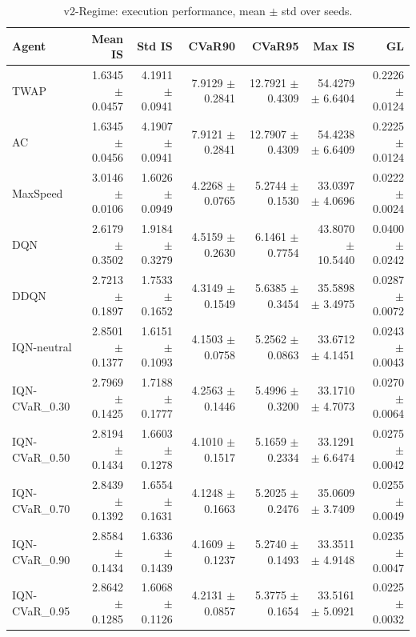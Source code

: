 \begin{table}[H]
    \centering
    \caption{v2-Regime: execution performance, mean $\pm$ std over seeds.}
    \label{tab:v2_regime_aggregate}
    \begin{tabular}{@{}lrrrrrr@{}}
        \toprule
        Agent & Mean IS & Std IS & CVaR90 & CVaR95 & Max IS & GL \\
        \midrule
        TWAP & 1.6345 $\pm$ 0.0457 & 4.1911 $\pm$ 0.0941 & 7.9129 $\pm$ 0.2841 & 12.7921 $\pm$ 0.4309 & 54.4279 $\pm$ 6.6404 & 0.2226 $\pm$ 0.0124 \\
        AC & 1.6345 $\pm$ 0.0456 & 4.1907 $\pm$ 0.0941 & 7.9121 $\pm$ 0.2841 & 12.7907 $\pm$ 0.4309 & 54.4238 $\pm$ 6.6409 & 0.2225 $\pm$ 0.0124 \\
        MaxSpeed & 3.0146 $\pm$ 0.0106 & 1.6026 $\pm$ 0.0949 & 4.2268 $\pm$ 0.0765 & 5.2744 $\pm$ 0.1530 & 33.0397 $\pm$ 4.0696 & 0.0222 $\pm$ 0.0024 \\
        DQN & 2.6179 $\pm$ 0.3502 & 1.9184 $\pm$ 0.3279 & 4.5159 $\pm$ 0.2630 & 6.1461 $\pm$ 0.7754 & 43.8070 $\pm$ 10.5440 & 0.0400 $\pm$ 0.0242 \\
        DDQN & 2.7213 $\pm$ 0.1897 & 1.7533 $\pm$ 0.1652 & 4.3149 $\pm$ 0.1549 & 5.6385 $\pm$ 0.3454 & 35.5898 $\pm$ 3.4975 & 0.0287 $\pm$ 0.0072 \\
        IQN-neutral & 2.8501 $\pm$ 0.1377 & 1.6151 $\pm$ 0.1093 & 4.1503 $\pm$ 0.0758 & 5.2562 $\pm$ 0.0863 & 33.6712 $\pm$ 4.1451 & 0.0243 $\pm$ 0.0043 \\
        IQN-CVaR\_0.30 & 2.7969 $\pm$ 0.1425 & 1.7188 $\pm$ 0.1777 & 4.2563 $\pm$ 0.1446 & 5.4996 $\pm$ 0.3200 & 33.1710 $\pm$ 4.7073 & 0.0270 $\pm$ 0.0064 \\
        IQN-CVaR\_0.50 & 2.8194 $\pm$ 0.1434 & 1.6603 $\pm$ 0.1278 & 4.1010 $\pm$ 0.1517 & 5.1659 $\pm$ 0.2334 & 33.1291 $\pm$ 6.6474 & 0.0275 $\pm$ 0.0042 \\
        IQN-CVaR\_0.70 & 2.8439 $\pm$ 0.1392 & 1.6554 $\pm$ 0.1631 & 4.1248 $\pm$ 0.1663 & 5.2025 $\pm$ 0.2476 & 35.0609 $\pm$ 3.7409 & 0.0255 $\pm$ 0.0049 \\
        IQN-CVaR\_0.90 & 2.8584 $\pm$ 0.1434 & 1.6336 $\pm$ 0.1439 & 4.1609 $\pm$ 0.1237 & 5.2740 $\pm$ 0.1493 & 33.3511 $\pm$ 4.9148 & 0.0235 $\pm$ 0.0047 \\
        IQN-CVaR\_0.95 & 2.8642 $\pm$ 0.1285 & 1.6068 $\pm$ 0.1126 & 4.2131 $\pm$ 0.0857 & 5.3775 $\pm$ 0.1654 & 33.5161 $\pm$ 5.0921 & 0.0225 $\pm$ 0.0032 \\
        \bottomrule
    \end{tabular}
\end{table}
